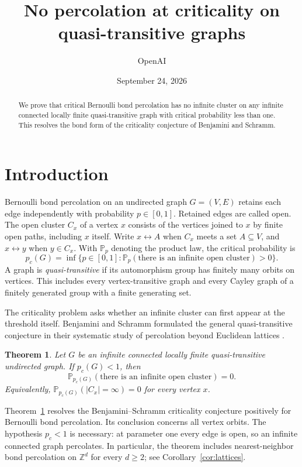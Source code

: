 \documentclass[11pt]{article}
\title{No percolation at criticality on quasi-transitive graphs}
\author{OpenAI}
\date{September 24, 2026}
\newtheorem{theorem}{Theorem}[section]
\theoremstyle{definition}
\begin{document}
\begin{abstract}
We prove that critical Bernoulli bond percolation has no infinite
cluster on any infinite connected locally finite quasi-transitive graph
with critical probability less than one. This resolves the bond form of
the criticality conjecture of Benjamini and Schramm.
\end{abstract}
\tableofcontents
\section{Introduction}
\label{sec:introduction}

Bernoulli bond percolation on an undirected graph $G=(V,E)$ retains
each edge independently with probability $p\in[0,1]$. Retained edges
are called open. The open cluster $C_x$ of a vertex $x$ consists of the
vertices joined to $x$ by finite open paths, including $x$ itself. Write
$x\leftrightarrow A$ when $C_x$ meets a set $A\subseteq V$, and
$x\leftrightarrow y$ when $y\in C_x$. With $\mathbb P_p$ denoting the product
law, the critical probability is
\[
 p_c(G)=\inf\{p\in[0,1]:
       \mathbb P_p(\text{there is an infinite open cluster})>0\}.
\]
A graph is \emph{quasi-transitive} if its automorphism group has finitely
many orbits on vertices. This includes every vertex-transitive graph
and every Cayley graph of a finitely generated group with a finite
generating set.

The criticality problem asks whether an infinite cluster can first
appear at the threshold itself. Benjamini and Schramm formulated the
general quasi-transitive conjecture in their systematic study of
percolation beyond Euclidean lattices
\cite[Conjecture~4]{BenjaminiSchramm1996}.

\begin{theorem}
\label{thm:main}
Let $G$ be an infinite connected locally finite quasi-transitive
undirected graph. If $p_c(G)<1$, then
\[
 \mathbb P_{p_c(G)}(\text{there is an infinite open cluster})=0.
\]
Equivalently, $\mathbb P_{p_c(G)}(|C_x|=\infty)=0$ for every vertex $x$.
\end{theorem}

Theorem~\ref{thm:main} resolves the Benjamini--Schramm criticality
conjecture positively for Bernoulli bond percolation. Its conclusion
concerns all vertex orbits.
The hypothesis $p_c<1$ is necessary: at parameter one every edge is
open, so an infinite connected graph percolates.
In particular, the theorem includes nearest-neighbor bond percolation on
$\mathbb Z^d$ for every $d\ge2$; see Corollary~\ref{cor:lattices}.
\end{document}
